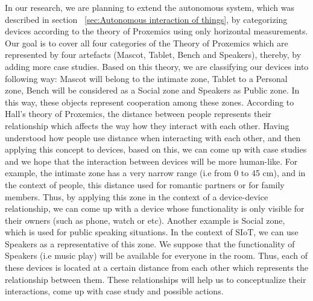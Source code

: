 \par In our research, we are planning to extend the autonomous system, which was described in section ~\ref{sec:Autonomous interaction of things}, by categorizing devices according to the theory of Proxemics using only horizontal measurements. Our goal is to cover all four categories of the Theory of Proxemics which are represented by four artefacts (Mascot, Tablet, Bench and Speakers), thereby, by adding more case studies. Based on this theory, we are classifying our devices into following way: Mascot will belong to the intimate zone, Tablet to a Personal zone, Bench will be considered as a Social zone and Speakers as Public zone. In this way, these objects represent cooperation among these zones. According to Hall’s theory of Proxemics, the distance between people represents their relationship which affects the way how they interact with each other. Having understood how people use distance when interacting with each other, and then applying this concept to devices, based on this, we can come up with case studies and we hope that the interaction between devices will be more human-like. For example, the intimate zone has a very narrow range (i.e from 0 to 45 cm), and in the context of people, this distance used for romantic partners or for family members. Thus, by applying this zone in the context of a device-device relationship, we can come up with a device whose functionality is only visible for their owners (such as phone, watch or etc). Another example is Social zone, which is used for public speaking situations. In the context of SIoT, we can use Speakers as a representative of this zone. We suppose that the functionality of Speakers (i.e music play) will be available for everyone in the room. Thus, each of these devices is located at a certain distance from each other which represents the relationship between them. These relationships will help us to conceptualize their interactions, come up with case study and possible actions.

